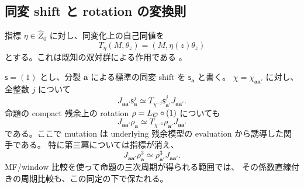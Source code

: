 \subsection{同変 shift と rotation の変換則}

指標 $\eta\in\widehat Z_0$ に対し、同変化上の自己同値を
\begin{equation}\label{mbza:eq:character-twist}
 T_\eta(M,\theta_z)=(M,\eta(z)\theta_z)
\end{equation}
とする。これは既知の双対群による作用である
\cite[\S4, before Theorem~4.2]{MEDElagin}。

\begin{proposition}
\label{mbza:prop:shift-character}
$\mathsf s=(1)$ とし、分裂 $\boldsymbol a$ による標準の同変 shift を
$\mathsf s_{\boldsymbol a}$ と書く。
$\chi=\chi_{\boldsymbol a\boldsymbol a'}$ に対し、全整数 $j$ について
\begin{equation}\label{mbza:eq:shift-character}
 J_{\boldsymbol a\boldsymbol a'}\mathsf s_{\boldsymbol a}^{j}
 \simeq T_{\chi^{-j}}\mathsf s_{\boldsymbol a'}^{j}
                     J_{\boldsymbol a\boldsymbol a'}.
\end{equation}
命題の compact 残余上の rotation
$\rho=L_{\mathcal O}\circ(1)$ についても
\begin{equation}\label{mbza:eq:rotation-character}
 J_{\boldsymbol a\boldsymbol a'}\rho_{\boldsymbol a}
 \simeq T_{\chi^{-1}}\rho_{\boldsymbol a'}
                      J_{\boldsymbol a\boldsymbol a'}
\end{equation}
である。ここで mutation は underlying 残余模型の evaluation から誘導した関手である。
特に第三冪については指標が消え、
\begin{equation}\label{mbza:eq:third-period}
 J_{\boldsymbol a\boldsymbol a'}\rho_{\boldsymbol a}^{3}
   \simeq\rho_{\boldsymbol a'}^{3}J_{\boldsymbol a\boldsymbol a'}.
\end{equation}
MF/window 比較を使って命題の三次周期が得られる範囲では、
その係数直線付きの周期比較も、この同定の下で保たれる。
\end{proposition}
